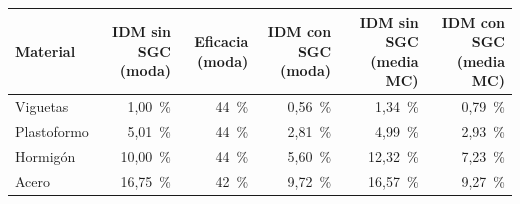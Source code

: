 \begin{tabularx}{\linewidth}{@{}Lrrrrr@{}}
\toprule
\textbf{Material} & \textbf{IDM sin SGC (moda)} & \textbf{Eficacia (moda)} & \textbf{IDM con SGC (moda)} & \textbf{IDM sin SGC (media MC)} & \textbf{IDM con SGC (media MC)} \\
\midrule
Viguetas & 1,00~\% & 44~\% & 0,56~\% & 1,34~\% & 0,79~\% \\
Plastoformo & 5,01~\% & 44~\% & 2,81~\% & 4,99~\% & 2,93~\% \\
Hormigón & 10,00~\% & 44~\% & 5,60~\% & 12,32~\% & 7,23~\% \\
Acero & 16,75~\% & 42~\% & 9,72~\% & 16,57~\% & 9,27~\% \\
\bottomrule
\end{tabularx}
